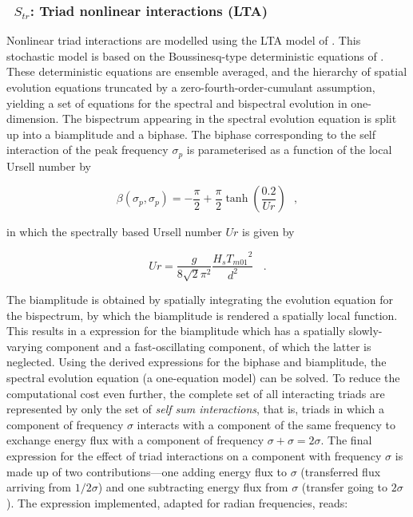 \vsssub
\subsubsection{~$S_{tr}$: Triad nonlinear interactions (LTA)} \label{sec:TR1}
\vsssub


\noindent
Nonlinear triad interactions are modelled using the LTA model of 
\citep{rep:Eld96}. This stochastic model is based on the 
Boussinesq-type deterministic equations of \citep{art:MS93}. 
These deterministic equations are ensemble averaged, and the hierarchy 
of spatial evolution equations truncated by a zero-fourth-order-cumulant 
assumption, yielding a set of equations for the spectral and bispectral 
evolution in one-dimension. The bispectrum appearing in the spectral 
evolution equation is split up into a biamplitude and a biphase. The 
biphase corresponding to the self interaction of the peak frequency 
$\sigma_p$ is parameterised as a function of the local Ursell number by

\begin{equation}
   \beta(\sigma_p,\sigma_p) = -\frac{\pi}{2} + \frac{\pi}{2}\tanh\left( \frac{0.2}{Ur} \right) \:\:\: ,
   \label{eq:biphase}
\end{equation}

\noindent
in which the spectrally based Ursell number $Ur$ is given by

\begin{equation}
   Ur = \frac{g}{8\sqrt{2} \pi^2} \frac{H_s {T_{m01}}^2}{d^2}\ \:\:\: .
   \label{eq:ursell}
\end{equation}

\noindent
The biamplitude is obtained by spatially integrating the evolution equation
for the bispectrum, by which the biamplitude is rendered a spatially local
function. This results in a expression for the biamplitude which has a
spatially slowly-varying component and a fast-oscillating component, of which
the latter is neglected. Using the derived expressions for the biphase and
biamplitude, the spectral evolution equation (a one-equation model) can be
solved. To reduce the computational cost even further, the complete set of all
interacting triads are represented by only the set of \textit{self sum
  interactions}, that is, triads in which a component of frequency $\sigma$
interacts with a component of the same frequency to exchange energy flux with
a component of frequency $\sigma + \sigma = 2\sigma$. The final expression for
the effect of triad interactions on a component with frequency $\sigma$ is
made up of two contributions---one adding energy flux to $\sigma$ (transferred
flux arriving from $1/2 \sigma$) and one subtracting energy flux from $\sigma$
(transfer going to $2 \sigma$). The expression implemented, adapted for radian
frequencies, reads:

